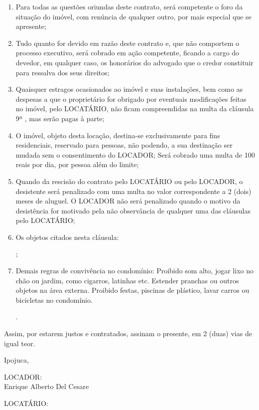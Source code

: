 \documentclass[a4paper,12pt]{article}
\begin{document}
\begin{enumerate}
\item Para todas as questões oriundas deste contrato, será competente o foro da situação do imóvel, com renúncia de qualquer outro, por mais especial que se apresente;
\item Tudo quanto for devido em razão deste contrato e, que não comportem o processo executivo, será cobrado em ação competente, ficando a cargo do devedor, em qualquer caso, os honorários do advogado que o credor constituir para ressalva dos seus direitos;
\item Quaisquer estragos ocasionados ao imóvel e suas instalações, bem como as despesas a que o proprietário for obrigado por eventuais modificações feitas no imóvel, pelo LOCATÁRIO, não ficam compreendidas na multa da cláusula 9ª , mas serão pagas à parte;
\item O imóvel, objeto desta locação, destina-se exclusivamente para fins residenciais, reservado para \makebox[2cm]{\hrulefill} pessoas,  não podendo, a sua destinação ser mudada sem o consentimento do LOCADOR;
Será cobrado uma multa de 100 reais por dia, por pessoa além do limite;
\item Quando da rescisão do contrato pelo LOCATÁRIO  ou pelo LOCADOR, o desistente será penalizado com uma multa no valor correspondente a 2 (dois) meses de aluguel. O LOCADOR não será penalizado quando o motivo da desistência for motivado pela não observância de qualquer uma das cláusulas pelo LOCATÁRIO;
\item Os objetos citados nesta cláusula: \hrulefill

\noindent \hrulefill ;
\item Demais regras de convivência no condomínio: Proibido som alto, jogar lixo no chão ou jardim, como cigarros, latinhas etc. 
Estender pranchas ou outros objetos na área externa.
Proibido festas, piscinas de plástico, lavar carros ou bicicletas no condomínio.\hrulefill

\nointend \hrulefill. 

\end{enumerate}
Assim, por estarem justos e contratados, assinam o presente, em 2 (duas) vias de igual teor.

\begin{flushright}
Ipojuca, \makebox[6cm]{\hrulefill}
\end{flushright}

\begin{center}

\vspace{2cm}

LOCADOR: \hrulefill
\\Enrique Alberto Del Cesare

\vspace{2.5cm}

LOCATÁRIO: \hrulefill
\\
 \end{center}
\end{document}
